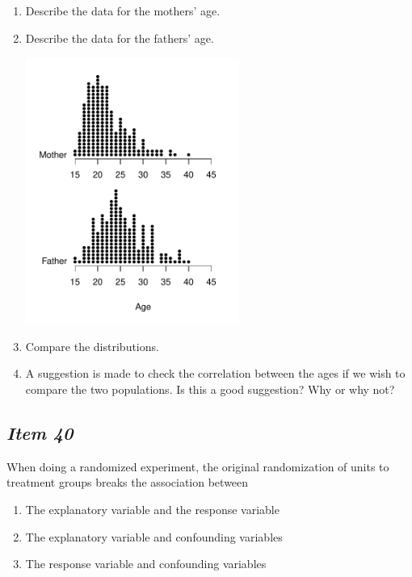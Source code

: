 \begin{enumerate}[leftmargin=1cm, itemsep=.2em]


\item Describe the data for the mothers' age.


\item Describe the data for the fathers' age.


\begin{marginfigure}


\includegraphics[width=2.75in]{includes/Item35.pdf}


\end{marginfigure}


\item Compare the distributions.


\item A suggestion is made to check the correlation between the ages if we wish to compare the two populations. Is this a good suggestion? Why or why not?


\end{enumerate}





\subsection{\textbf{\textit{Item 40}}}


When doing a randomized experiment, the original randomization of units to
treatment groups breaks the association between
\begin{enumerate} [leftmargin=2cm, itemsep=.2em]


\item The explanatory variable and the response variable


\item The explanatory variable and confounding variables


\item The response variable and confounding variables


\end{enumerate}





